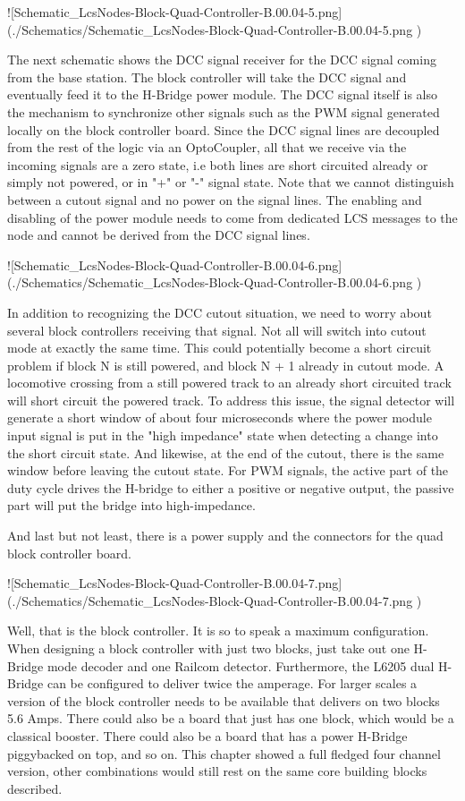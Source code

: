 ![Schematic_LcsNodes-Block-Quad-Controller-B.00.04-5.png](./Schematics/Schematic_LcsNodes-Block-Quad-Controller-B.00.04-5.png )

The next schematic shows the DCC signal receiver for the DCC signal coming from the base station. The block controller will take the DCC signal and eventually feed it to the H-Bridge power module. The DCC signal itself is also the mechanism to synchronize other signals such as the PWM signal generated locally on the block controller board. Since the DCC signal lines are decoupled from the rest of the logic via an OptoCoupler, all that we receive via the incoming signals are a zero state, i.e both lines are short circuited already or simply not powered, or in "+" or "-" signal state. Note that we cannot distinguish between a cutout signal and no power on the signal lines. The enabling and disabling of the power module needs to come from dedicated LCS messages to the node and cannot be derived from the DCC signal lines.

![Schematic_LcsNodes-Block-Quad-Controller-B.00.04-6.png](./Schematics/Schematic_LcsNodes-Block-Quad-Controller-B.00.04-6.png )

In addition to recognizing the DCC cutout situation, we need to worry about several block controllers receiving that signal. Not all will switch into cutout mode at exactly the same time. This could potentially become a short circuit problem if block N is still powered, and block N + 1 already in cutout mode. A locomotive crossing from a still powered track to an already short circuited track will short circuit the powered track. To address this issue, the signal detector will generate a short window of about four microseconds where the power module input signal is put in the "high impedance" state when detecting a change into the short circuit state. And likewise, at the end of the cutout, there is the same window before leaving the cutout state. For PWM signals, the active part of the duty cycle drives the H-bridge to either a positive or negative output, the passive part will put the bridge into high-impedance.

And last but not least, there is a power supply and the connectors for the quad block controller board.

![Schematic_LcsNodes-Block-Quad-Controller-B.00.04-7.png](./Schematics/Schematic_LcsNodes-Block-Quad-Controller-B.00.04-7.png )

Well, that is the block controller. It is so to speak a maximum configuration. When designing a block controller with just two blocks, just take out one H-Bridge mode decoder and one Railcom detector. Furthermore, the L6205 dual H-Bridge can be configured to deliver twice the amperage. For larger scales a version of the block controller needs to be available that delivers on two blocks 5.6 Amps. There could also be a board that just has one block, which would be a classical booster. There could also be a board that has a power H-Bridge piggybacked on top, and so on. This chapter showed a full fledged four channel version, other combinations would still rest on the same core building blocks described.

